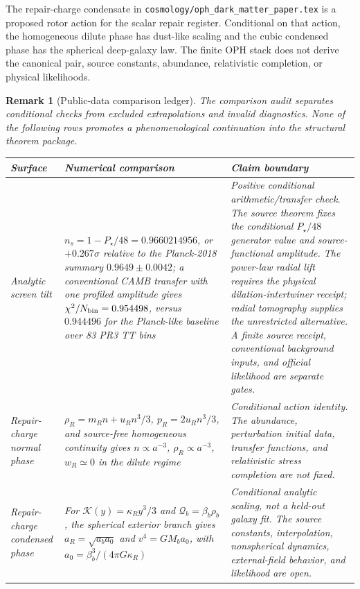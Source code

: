 \documentclass[11pt]{article}
\newtheorem{remark}[theorem]{Remark}
\begin{document}
The repair-charge condensate in
\texttt{cosmology/oph\_dark\_matter\_paper.tex} is a proposed rotor action for
the scalar repair register. Conditional on that action, the homogeneous dilute
phase has dust-like scaling and the cubic condensed phase has the spherical
deep-galaxy law. The finite OPH stack does not derive the canonical pair,
source constants, abundance, relativistic completion, or physical likelihoods.

\begin{remark}[Public-data comparison ledger]\label{rem:round-one-cosmology-ledger}
The comparison audit separates conditional checks from excluded extrapolations
and invalid diagnostics.  None of the following
rows promotes a phenomenological continuation into the structural theorem package.
\begin{center}
\small
\begin{tabular}{@{}>{\raggedright\arraybackslash}p{}>{\raggedright\arraybackslash}p{}>{\raggedright\arraybackslash}p{}@{}}
\toprule
Surface & Numerical comparison & Claim boundary \\
\midrule
Analytic screen tilt &
\(n_s=1-P_\star/48=0.9660214956\), or \(+0.267\sigma\) relative to the Planck-2018 summary \(0.9649\pm0.0042\); a conventional CAMB transfer with one profiled amplitude gives \(\chi^2/N_{\rm bin}=0.954498\), versus \(0.944496\) for the Planck-like baseline over 83 PR3 TT bins &
Positive conditional arithmetic/transfer check. The source theorem fixes the conditional \(P_\star/48\) generator value and source-functional amplitude. The power-law radial lift requires the physical dilation-intertwiner receipt; radial tomography supplies the unrestricted alternative. A finite source receipt, conventional background inputs, and official likelihood are separate gates.\\
Repair-charge normal phase &
\(\rho_R=m_Rn+u_Rn^3/3\), \(p_R=2u_Rn^3/3\), and source-free homogeneous continuity gives \(n\propto a^{-3}\), \(\rho_R\propto a^{-3}\), \(w_R\simeq0\) in the dilute regime &
Conditional action identity. The abundance, perturbation initial data, transfer functions, and relativistic stress completion are not fixed.\\
Repair-charge condensed phase &
For \(\mathcal K(y)=\kappa_Ry^3/3\) and \(\mathcal Q_b=\beta_b\rho_b\), the spherical exterior branch gives \(a_R=\sqrt{a_ba_0}\) and \(v^4=GM_ba_0\), with \(a_0=\beta_b^3/(4\pi G\kappa_R)\) &
Conditional analytic scaling, not a held-out galaxy fit. The source constants, interpolation, nonspherical dynamics, external-field behavior, and likelihood are open.\\

\end{tabular}
\end{center}
\end{remark}
\end{document}
